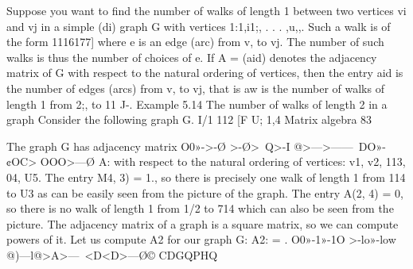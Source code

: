 ﻿\documentclass{beamer}
\begin{document}
Suppose you want to ﬁnd the number of walks of length 1 between
two vertices vi and vj in a simple (di) graph G with vertices
1:1,i1;, . . . ,u,,. Such a walk is of the form 1116177] where e is an edge
(arc) from v, to vj. The number of such walks is thus the number of
choices of e. If A = (aid) denotes the adjacency matrix of G with
respect to the natural ordering of vertices, then the entry aid is the
number of edges (arcs) from v, to vj, that is aw is the number of
walks of length 1 from 2;, to 11 J-.
Example 5.14 The number of walks of length 2 in a graph
Consider the following graph G.
I/1 112
[F
U; 1,4
Matrix algebra
83


The graph G has adjacency matrix
O0»->-\O
>-\O>~Q>-I
@>—\®>—\>—\
DO»-¢OC>
OOO>—\O
A:
with respect to the natural ordering of vertices: v1, v2, 113, 04, U5.
The entry M4, 3) = 1., so there is precisely one walk of length 1 from
114 to U3 as can be easily seen from the picture of the graph. The
entry A(2, 4) = 0, so there is no walk of length 1 from 1/2 to 714 which
can also be seen from the picture.
The adjacency matrix of a graph is a square matrix, so we can
compute powers of it. Let us compute A2 for our graph G:
A2: = .
O0»-1»-1O
>-lo»-low
@)—l@>A>—\
<D<D>—\O©
CDGQPHQ
 \1
\end{document}
